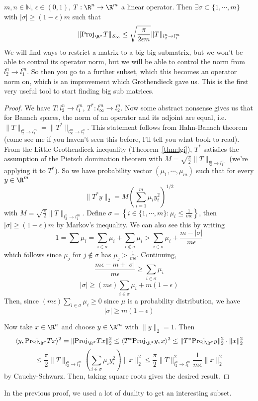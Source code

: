 \begin{lem} 
$m, n \in \mathbb{N}$, $\epsilon \in (0, 1)$, $T: \R^n \to \R^m$ a linear operator. Then $\exists \sigma \subset \{1, \cdots, m\}$ with $|\sigma| \geq (1 - \epsilon)m$ such that 
\[
\|\text{Proj}_{\R^{\sigma}} T\|_{S_{\infty}} \leq \sqrt{\frac{\pi}{2\epsilon m}} \|T\|_{l_2^n \to l_1^m}
\] 
We will find ways to restrict a matrix to a big big submatrix, but we won't be able to control its operator norm, but we will be able to control the norm from $l_2^n \to l_1^m$. So then you go to a further subset, which this becomes an operator norm on, which is an improvement which Grothendieck gave us. This is the first very useful tool to start finding big sub matrices. 
\end{lem}
\begin{proof}
We have $T: l_2^n \to l_1^m$, $T^*: l_{\infty}^m \to l_2^n$. Now some abstract nonsense gives us that for Banach spaces, the norm of an operator and its adjoint are equal, i.e. $\|T\|_{l_2^n \to l_1^m}  = \|T^*\|_{l_{\infty}^m \to l_2^n}$. This statement follows from Hahn-Banach theorem (come see me if you haven't seen this before, I'll tell you what book to read). 
From the Little Grothendieck inequality (Theorem~\ref{thm:lgi}), $T^*$ satisfies the assumption of the Pietsch domination theorem with $M = \sqrt{\frac{\pi}{2}} \|T\|_{l_2^n \to l_1^m}$ (we're applying it to $T^*$). So we have probability vector $(\mu_1, \cdots, \mu_m)$ such that for every $y \in \R^m$
\[
\|T^*y\|_2 = M\left(\sum_{i = 1}^m \mu_iy_i^2\right)^{1/2}
\]
with $M = \sqrt{\frac{\pi}{2}} \|T\|_{l_2^n \to l_1^m}$. Define $\sigma = \left\{i \in \{1, \cdots, m\}: \mu_i \leq \frac{1}{m\epsilon}\right\}$, then $|\sigma| \geq (1 - \epsilon)m$ by Markov's inequality. We can also see this by writing
\[
1 = \sum \mu_i = \sum_{i \in \sigma} \mu_i + \sum_{i \not\in \sigma} \mu_i > \sum_{i \in \sigma} \mu_i + \frac{m - |\sigma|}{m\epsilon}
\]
which follows since $\mu_j$ for $j \not\in \sigma$ has $\mu_j > \frac{1}{m\epsilon}$. Continuing, 
\[
\frac{m\epsilon - m + |\sigma|}{m\epsilon} \geq \sum_{i \in \sigma} \mu_i
\]
\[
|\sigma| \geq (m\epsilon)\sum_{i \in \sigma} \mu_i +  m(1 - \epsilon)
\]
Then, since $(m\epsilon)\sum_{i \in \sigma} \mu_i  \geq 0$ since $\mu$ is a probability distribution, we have
\[
|\sigma| \geq m(1 - \epsilon)
\]

Now take $x \in \R^n$ and choose $y \in \R^m$ with $\|y\|_2 = 1$. Then 
\[
\langle y, \text{Proj}_{\R^{\sigma}} Tx \rangle^2 = \|\text{Proj}_{\R^{\sigma}} Tx\|_2^2 \leq \langle T^* \text{Proj}_{\R^{\sigma}} y, x \rangle^2 \leq \|T^*\text{Proj}_{\R^{\sigma}} y\|_2^2 \cdot \|x\|_2^2
\] 
\[
\leq \frac{\pi}{2}\|T\|_{l_2^n \to l_1^m} \left(\sum_{i \in \sigma} \mu_iy_i^2\right) \|x\|_2^2 \leq \frac{\pi}{2} \|T\|_{l_2^n \to l_1^m}^2 \frac{1}{m\epsilon}\|x\|_2^2
\]
by Cauchy-Schwarz. Then, taking square roots gives the desired result.
\end{proof}
In the previous proof, we used a lot of duality to get an interesting subset. 

